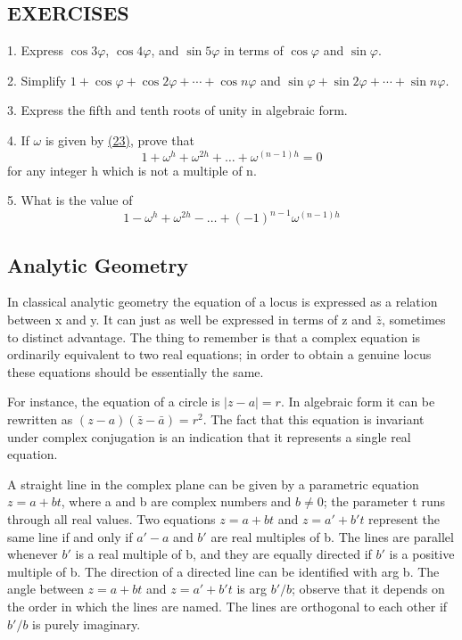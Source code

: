 \subsection*{EXERCISES}
1. Express $\cos 3\varphi$, $\cos 4\varphi$, and $\sin 5\varphi$ in terms of $\cos \varphi$ and $\sin \varphi$.

2. Simplify $1 + \cos \varphi + \cos 2\varphi + \cdots + \cos n\varphi$ and $\sin \varphi + \sin 2\varphi + \cdots + \sin n\varphi$.

3. Express the fifth and tenth roots of unity in algebraic form.

4. If $\omega$ is given by \hyperref[eq:1.23]{(23)}, prove that
\begin{equation*}
1 + \omega^ {h} + \omega^ {2 h} + \dots + \omega^ {(n - 1) h} = 0
\end{equation*}
for any integer h which is not a multiple of n.


5. What is the value of
\begin{equation*}
1 - \omega^ {h} + \omega^ {2 h} - \dots + (- 1) ^ {n - 1} \omega^ {(n - 1) h}
\end{equation*}
\setcounter{section}{2}\setcounter{subsection}{2}\subsection{Analytic Geometry}\label{sec:1.2.3}
In classical analytic geometry the equation of a locus is expressed as a relation between x and y. It can just as well be expressed in terms of z and $\bar{z}$, sometimes to distinct advantage. The thing to remember is that a complex equation is ordinarily equivalent to two real equations; in order to obtain a genuine locus these equations should be essentially the same.

For instance, the equation of a circle is $|z - a| = r$. In algebraic form it can be rewritten as $(z - a)(\bar{z} - \bar{a}) = r^{2}$. The fact that this equation is invariant under complex conjugation is an indication that it represents a single real equation.

A straight line in the complex plane can be given by a parametric equation $z = a + bt$, where a and b are complex numbers and $b \neq 0$; the parameter t runs through all real values. Two equations $z = a + bt$ and $z = a' + b't$ represent the same line if and only if $a' - a$ and $b'$ are real multiples of b. The lines are parallel whenever $b'$ is a real multiple of b, and they are equally directed if $b'$ is a positive multiple of b. The direction of a directed line can be identified with arg b. The angle between $z = a + bt$ and $z = a' + b't$ is arg $b'/b$; observe that it depends on the order in which the lines are named. The lines are orthogonal to each other if $b'/b$ is purely imaginary.

